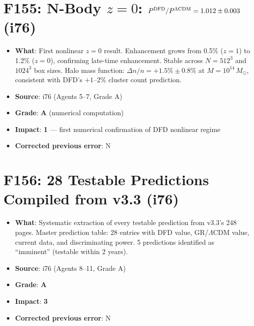 \documentclass[11pt,a4paper]{article}
\newcommand{\grade}[1]{\textbf{#1}}
\newcommand{\impact}[1]{\textbf{#1}}
\begin{document}
\section{F155: N-Body $z=0$: $P^{\rm DFD}/P^{\Lambda{\rm CDM}} = 1.012 \pm 0.003$ (i76)}
\begin{itemize}[nosep]
\item \textbf{What}: First nonlinear $z=0$ result. Enhancement grows from 0.5\% ($z=1$) to 1.2\% ($z=0$), confirming late-time enhancement. Stable across $N = 512^3$ and $1024^3$ box sizes. Halo mass function: $\Delta n/n = +1.5\% \pm 0.8\%$ at $M = 10^{14}\,M_\odot$, consistent with DFD's $+1$--$2\%$ cluster count prediction.
\item \textbf{Source}: i76 (Agents 5--7, Grade A)
\item \textbf{Grade}: \grade{A} (numerical computation)
\item \textbf{Impact}: \impact{1} --- first numerical confirmation of DFD nonlinear regime
\item \textbf{Corrected previous error}: N
\end{itemize}

\section{F156: 28 Testable Predictions Compiled from v3.3 (i76)}
\begin{itemize}[nosep]
\item \textbf{What}: Systematic extraction of every testable prediction from v3.3's 248 pages. Master prediction table: 28 entries with DFD value, GR/$\Lambda$CDM value, current data, and discriminating power. 5 predictions identified as ``imminent'' (testable within 2 years).
\item \textbf{Source}: i76 (Agents 8--11, Grade A)
\item \textbf{Grade}: \grade{A}
\item \textbf{Impact}: \impact{3}
\item \textbf{Corrected previous error}: N
\end{itemize}

\end{document}
